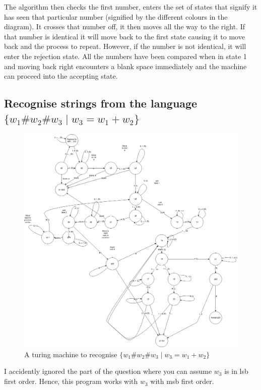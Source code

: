 \documentclass{article}
\begin{document}
The algorithm then checks the first number, enters the set of states that signify it has seen that particular number (signified by the different colours in the diagram). It crosses that number off, it then moves all the way to the right. If that number is identical it will move back to the first state causing it to move back and the process to repeat. However, if the number is not identical, it will enter the rejection state. All the numbers have been compared when in state 1 and moving back right encounters a blank space immediately and the machine can proceed into the accepting state.

\newpage

\subsection{Recognise strings from the language $ \{ w_1\#w_2\#w_3 \mid w_3 = w_1 + w_2 \} $}

\begin{figure}[!htb]
  \caption{A turing machine to recognise $ \{ w_1\#w_2\#w_3 \mid w_3 = w_1 + w_2 \} $}
  \centering
  \includegraphics[scale=0.20]{images/subtractomatic.png}
\end{figure}

I accidently ignored the part of the question where you can assume $w_3$ is in lsb first order. Hence, this program works with $w_3$ with msb first order.
\end{document}
